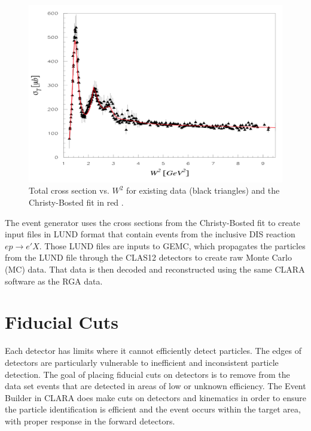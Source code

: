 \begin{figure}[h!]
	\centering
	\includegraphics[width=0.9\linewidth]{figures/christy_bosted_fit.png}
	\caption[Total cross section vs. $W^2$ for existing data (black triangles) and the Christy-Bosted fit in red.]{Total cross section vs. $W^2$ for existing data (black triangles) and the Christy-Bosted fit in red \cite{christy_bosted}.}
	\label{fig:christy_bosted}
\end{figure}

The event generator uses the cross sections from the Christy-Bosted fit to create input files in LUND format that contain events from the inclusive DIS reaction $ep\rightarrow e'X$. Those LUND files are inputs to GEMC, which propagates the particles from the LUND file through the CLAS12 detectors to create raw Monte Carlo (MC) data. That data is then decoded and reconstructed using the same CLARA software as the RGA data.

\section{Fiducial Cuts}
Each detector has limits where it cannot efficiently detect particles. The edges of detectors are particularly vulnerable to inefficient and inconsistent particle detection. The goal of placing fiducial cuts on detectors is to remove from the data set events that are detected in areas of low or unknown efficiency. The Event Builder in CLARA does make cuts on detectors and kinematics in order to ensure the particle identification is efficient and the event occurs within the target area, with proper response in the forward detectors.

